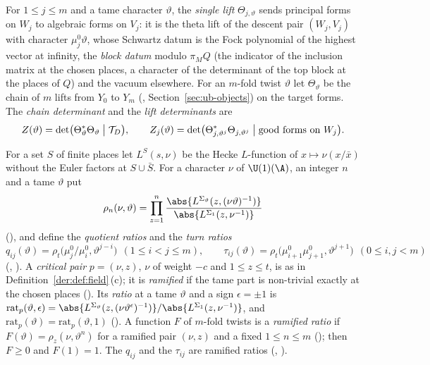 \begin{definition}\label{det-chain:def:det}
For $1\le j\le m$ and a tame character $\vartheta$, the \emph{single lift} $\Theta_{j,\vartheta}$
sends principal forms on $W_j$ to algebraic forms on $V_j$: it is the theta lift of the descent
pair $(W_j,V_j)$ with character $\mu_j^0\vartheta$, whose Schwartz datum is the Fock polynomial of
the highest vector at infinity, the \emph{block datum} modulo $\pi_M Q$ (the indicator of the
inclusion matrix at the chosen places, a character of the determinant of the top block at the
places of $Q$) and the vacuum elsewhere. For an $m$-fold twist $\vartheta$ let $\Theta_\vartheta$
be the chain of $m$ lifts from $Y_0$ to $Y_m$ (,
Section~\ref{sec:ub-objects}) on the target forms. The \emph{chain determinant} and the \emph{lift
determinants} are
\[
  Z(\vartheta)=\det\bigl(\Theta_\vartheta^*\Theta_\vartheta\bigm|\mathcal{T}_D\bigr),\qquad
  Z_j(\vartheta)=\det\bigl(\Theta_{j,\vartheta^j}^*\Theta_{j,\vartheta^j}\bigm|
  \text{good forms on }W_j\bigr).
\]
\end{definition}

For a set $S$ of finite places let $L^S(s,\nu)$ be the Hecke $L$-function of $x\mapsto\nu(x/\bar x)$
without the Euler factors at $S\cup\bar S$. For a
character $\nu$ of $\U(1)(\A)$, an integer $n$ and a tame $\vartheta$ put
\begin{equation}\label{det-chain:eq:rho}
  \rho_n(\nu,\vartheta)=\prod_{z=1}^{n}
  \frac{\abs{L^{\Sigma_\vartheta}(z,(\nu\vartheta)^{-1})}}{\abs{L^{\Sigma_1}(z,\nu^{-1})}}
\end{equation}
(), and define the \emph{quotient ratios} and the \emph{turn ratios}
\[
  q_{ij}(\vartheta)=\rho_t\bigl(\mu_j^0/\mu_i^0,\vartheta^{j-i}\bigr)\ \ (1\le i<j\le m),\qquad
  \tau_{ij}(\vartheta)=\rho_t\bigl(\mu_{i+1}^0\mu_{j+1}^0,\vartheta^{j+1}\bigr)\ \ (0\le i,j<m)
\]
(, ). A \emph{critical pair} $p=(\nu,z)$, $\nu$
of weight $-c$ and $1\le z\le t$, is as in Definition~\ref{der:def:field}\,(c); it is
\emph{ramified} if the tame part is non-trivial exactly at the chosen places
(). Its \emph{ratio} at a tame $\vartheta$ and a sign
$\epsilon=\pm1$ is $\mathrm{rat}_p(\vartheta,\epsilon)=\abs{L^{\Sigma_\vartheta}(z,(\nu\vartheta^\epsilon)^{-1})}/\abs{L^{\Sigma_1}(z,\nu^{-1})}$,
and $\mathrm{rat}_p(\vartheta)=\mathrm{rat}_p(\vartheta,1)$
(). A function $F$ of $m$-fold twists is a \emph{ramified
ratio} if $F(\vartheta)=\rho_z(\nu,\vartheta^n)$ for a ramified pair $(\nu,z)$ and a fixed
$1\le n\le m$ (); then $F\ge0$ and $F(1)=1$. The $q_{ij}$ and the
$\tau_{ij}$ are ramified ratios (,
).

